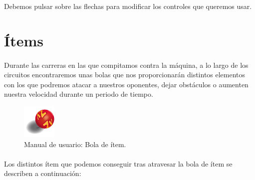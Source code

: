 Debemos pulsar sobre las flechas para modificar los controles que queremos usar.

\section{Ítems}

\paragraph{}
Durante las carreras en las que compitamos contra la máquina, a lo largo de los circuitos encontraremos unas bolas que nos
proporcionarán distintos elementos con los que podremos atacar a nuestros oponentes, dejar obstáculos o aumenten nuestra velocidad
durante un periodo de tiempo.

\begin{figure}[H]
  \label{caja_item}
  \begin{center}
    \includegraphics[scale=1]{imagenes/items/item_box.png}
  \end{center}
 \caption{Manual de usuario: Bola de ítem.}
\end{figure}

\paragraph{}
Los distintos ítem que podemos conseguir tras atravesar la bola de ítem se describen a continuación:

